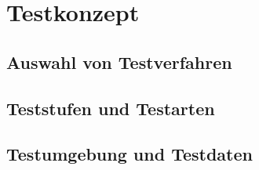 \section{Testkonzept}\label{Testkonzept}

\subsection{Auswahl von Testverfahren}


\subsection{Teststufen und Testarten}


\subsection{Testumgebung und Testdaten}

